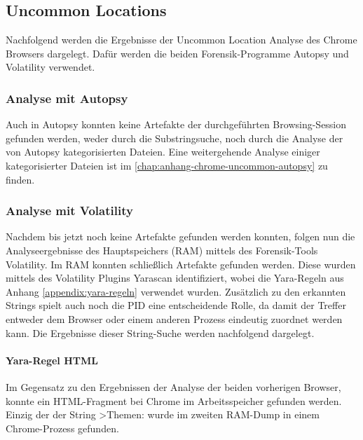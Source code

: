 \subsection*{Uncommon Locations}\label{chap:ergebnisse-chrome-uncommon-locations}

Nachfolgend werden die Ergebnisse der Uncommon Location Analyse des Chrome Browsers dargelegt. Dafür werden die beiden Forensik-Programme Autopsy und Volatility verwendet.

\subsubsection*{Analyse mit Autopsy}\label{chap:ergebnisse-chrome-uncommon-autopsy}

Auch in Autopsy konnten keine Artefakte der durchgeführten Browsing-Session gefunden werden, weder durch die Substringsuche, noch durch die Analyse der von Autopsy kategorisierten Dateien. Eine weitergehende Analyse einiger kategorisierter Dateien ist im \autoref{chap:anhang-chrome-uncommon-autopsy} zu finden.

\subsubsection*{Analyse mit Volatility}\label{chap:ergebnisse-chrome-uncommon-volatility}

Nachdem bis jetzt noch keine Artefakte gefunden werden konnten, folgen nun die Analyseergebnisse des Hauptspeichers (RAM) mittels des Forensik-Tools Volatility. Im RAM konnten schließlich Artefakte gefunden werden. Diese wurden mittels des Volatility Plugins Yarascan identifiziert, wobei die Yara-Regeln aus Anhang \ref{appendix:yara-regeln} verwendet wurden. Zusätzlich zu den erkannten Strings spielt auch noch die PID eine entscheidende Rolle, da damit der Treffer entweder dem Browser oder einem anderen Prozess eindeutig zuordnet werden kann. Die Ergebnisse dieser String-Suche werden nachfolgend dargelegt.

\paragraph*{Yara-Regel \glqq{}HTML\grqq{}}\label{chap:ergebnisse-chrome-uncommon-volatility-html}

Im Gegensatz zu den Ergebnissen der Analyse der beiden vorherigen Browser, konnte ein HTML-Fragment bei Chrome im Arbeitsspeicher gefunden werden. Einzig der der String \glqq{}>Themen:\grqq{} wurde im zweiten RAM-Dump in einem Chrome-Prozess gefunden.

